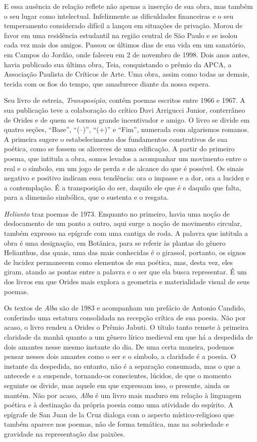 \documentclass[12pt]{extarticle}
\begin{document}
E essa ausência de relação reflete não apenas a inserção de sua obra,
mas também o seu lugar como intelectual. Infelizmente as dificuldades
financeiras e o seu temperamento considerado difícil a lançou em
situações de privação. Morou de favor em uma residência estudantil na
região central de São Paulo e se isolou cada vez mais dos amigos. Passou
os últimos dias de sua vida em um sanatório, em Campos do Jordão, onde
faleceu em 2 de novembro de 1998. Dois anos antes, havia publicado sua
última obra, Teia, conquistando o prêmio da APCA, a Associação Paulista
de Críticos de Arte. Uma obra, assim como todas as demais, tecida com os
fios do tempo, que amadurece diante da nossa espera.

Seu livro de estreia, \emph{Transposição}, contém poemas escritos entre
1966 e 1967. A sua publicação teve a colaboração do crítico Davi
Arrigucci Junior, conterrâneo de Orides e de quem se tornou grande
incentivador e amigo. O livro se divide em quatro seções, ``Base'',
``(--)'', ``(+)'' e ``Fim'', numerada com algarismos romanos. A primeira
sugere o estabelecimento dos fundamentos construtivos de sua poética,
como se fossem os alicerces de uma edificação. A partir do primeiro
poema, que intitula a obra, somos levados a acompanhar um movimento
entre o real e o símbolo, em um jogo de perda e de alcance do que é
possível. Os sinais negativo e positivo indicam essa tendência: ora o
impasse e a dor, ora a lucidez e a contemplação. É a transposição do
ser, daquilo ele que é e daquilo que falta, para a dimensão simbólica,
que o sustenta e o resgata.

\emph{Helianto} traz poemas de 1973. Enquanto no primeiro, havia uma
noção de deslocamento de um ponto a outro, aqui surge a noção de
movimento circular, também expresso na epígrafe com uma cantiga de roda.
A palavra que intitula a obra é uma designação, em Botânica, para se
referir às plantas do gênero Helianthus, das quais, uma das mais
conhecidas é o girassol, portanto, os signos de lucidez permanecem como
elementos de sua poética, mas, desta vez, eles giram, atando as pontas
entre a palavra e o ser que ela busca representar. É um dos livros em
que Orides mais explora a geometria e materialidade visual de seus
poemas.

Os textos de \emph{Alba} são de 1983 e acompanham um prefácio de Antonio
Candido, conferindo uma estatura consolidada na recepção crítica de sua
poesia. Não por acaso, o livro rendeu a Orides o Prêmio Jabuti. O título
tanto remete à primeira claridade da manhã quanto a um gênero lírico
medieval em que há a despedida de dois amantes nesse mesmo instante do
dia. De uma certa maneira, podemos pensar nesses dois amantes como o ser
e o símbolo, a claridade é a poesia. O instante da despedida, no
entanto, não é a separação consumada, mas o que a antecede e a suspende,
tornando-os conscientes, lúcidos, de que o momento seguinte os divide,
mas aquele em que expressam isso, o presente, ainda os mantém. Não por
acaso, \emph{Alba} é um livro mais maduro em relação à linguagem poética
e à destinação da própria poesia como uma atividade do espírito. A
epígrafe de San Juan de la Cruz dialoga com o aspecto místico-religioso
que também aparece nos poemas, não de forma temática, mas na sobriedade
e gravidade na representação das paixões.
\end{document}
